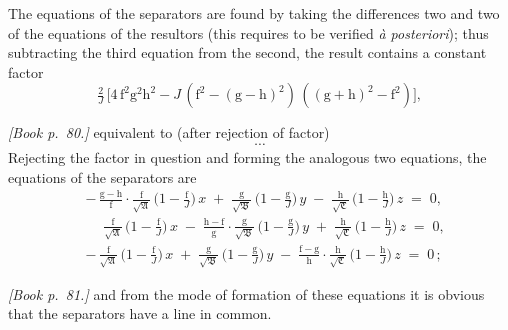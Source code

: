 \documentclass[11pt]{article}
\providecommand{\fA}{\mathfrak{A}}
\providecommand{\fB}{\mathfrak{B}}
\providecommand{\fC}{\mathfrak{C}}
\begin{document}
The equations of the separators are found by taking the differences two and two of the equations of the resultors (this requires to be verified \emph{\`a posteriori}); thus subtracting the third equation from the second, the result contains a constant factor
\[
\tfrac{2}{J}\,\bigl[4\,\mathrm{f}^{2}\mathrm{g}^{2}\mathrm{h}^{2} - J\,(\mathrm{f}^{2} - (\mathrm{g} - \mathrm{h})^{2})\,((\mathrm{g} + \mathrm{h})^{2} - \mathrm{f}^{2})\bigr],
\]

\bigskip

\noindent\emph{[Book p.~80.]} equivalent to (after rejection of factor)
\[
\cdots
\]
Rejecting the factor in question and forming the analogous two equations, the equations of the separators are
\begin{align*}
&-\,\tfrac{\mathrm{g} - \mathrm{h}}{\mathrm{f}}\cdot\tfrac{\mathrm{f}}{\sqrt{\fA}}\,\bigl(1 - \tfrac{\mathrm{f}}{J}\bigr)\,x \;+\; \tfrac{\mathrm{g}}{\sqrt{\fB}}\,\bigl(1 - \tfrac{\mathrm{g}}{J}\bigr)\,y \;-\; \tfrac{\mathrm{h}}{\sqrt{\fC}}\,\bigl(1 - \tfrac{\mathrm{h}}{J}\bigr)\,z \;=\; 0,\\
&\;\;\;\;\,\tfrac{\mathrm{f}}{\sqrt{\fA}}\,\bigl(1 - \tfrac{\mathrm{f}}{J}\bigr)\,x \;-\; \tfrac{\mathrm{h} - \mathrm{f}}{\mathrm{g}}\cdot\tfrac{\mathrm{g}}{\sqrt{\fB}}\,\bigl(1 - \tfrac{\mathrm{g}}{J}\bigr)\,y \;+\; \tfrac{\mathrm{h}}{\sqrt{\fC}}\,\bigl(1 - \tfrac{\mathrm{h}}{J}\bigr)\,z \;=\; 0,\\
&-\,\tfrac{\mathrm{f}}{\sqrt{\fA}}\,\bigl(1 - \tfrac{\mathrm{f}}{J}\bigr)\,x \;+\; \tfrac{\mathrm{g}}{\sqrt{\fB}}\,\bigl(1 - \tfrac{\mathrm{g}}{J}\bigr)\,y \;-\; \tfrac{\mathrm{f} - \mathrm{g}}{\mathrm{h}}\cdot\tfrac{\mathrm{h}}{\sqrt{\fC}}\,\bigl(1 - \tfrac{\mathrm{h}}{J}\bigr)\,z \;=\; 0\,;
\end{align*}

\bigskip

\noindent\emph{[Book p.~81.]} and from the mode of formation of these equations it is obvious that the separators have a line in common.
\end{document}
